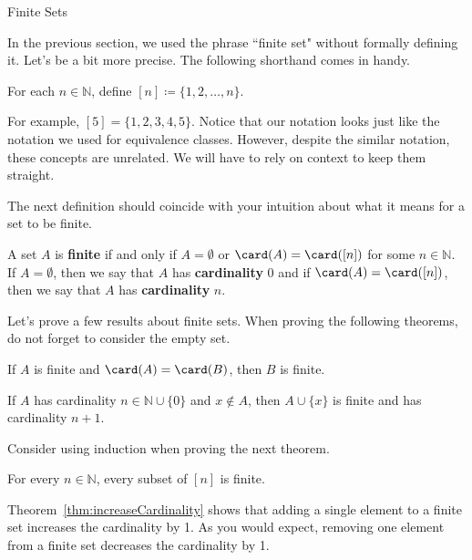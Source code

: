 \begin{section}{Finite Sets}

In the previous section, we used the phrase ``finite set" without formally defining it. Let's be a bit more precise. The following shorthand comes in handy.

\begin{definition}
For each $n\in \mathbb{N}$, define $\boxed{[n]\coloneqq \{1,2,\ldots,n\}}$.
\end{definition}

For example, $[5]=\{1,2,3,4,5\}$.  Notice that our notation looks just like the notation we used for equivalence classes. However, despite the similar notation, these concepts are unrelated. We will have to rely on context to keep them straight.

The next definition should coincide with your intuition about what it means for a set to be finite.

\begin{definition}
A set $A$ is \textbf{finite} if and only if $A=\emptyset$ or $\card(A)=\card([n])$ for some $n\in\mathbb{N}$. If $A=\emptyset$, then we say that $A$ has \textbf{cardinality} 0 and if $\card(A)=\card([n])$, then we say that $A$ has \textbf{cardinality} $n$.
\end{definition}

Let's prove a few results about finite sets. When proving the following theorems, do not forget to consider the empty set.

\begin{theorem}\label{thm:finiteSetsSameCardinality}
If $A$ is finite and $\card(A)=\card(B)$, then $B$ is finite.
\end{theorem}

\begin{theorem}\label{thm:increaseCardinality}
If $A$ has cardinality $n\in\mathbb{N}\cup\{0\}$ and $x\notin A$, then $A\cup\{x\}$ is finite and has cardinality $n+1$.
\end{theorem}

Consider using induction when proving the next theorem.

\begin{theorem}\label{thm:subsetsFiniteSets}
For every $n\in\mathbb{N}$, every subset of $[n]$ is finite.
\end{theorem}

Theorem~\ref{thm:increaseCardinality} shows that adding a single element to a finite set increases the cardinality by 1. As you would expect, removing one element from a finite set decreases the cardinality by 1.


\end{section}
